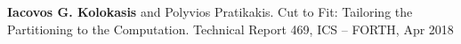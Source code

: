 
\vspace{-15pt}
\begin{cventries}

  \cventry
    {}
    {}
    {}
    {}
    {\textbf{Iacovos G. Kolokasis} and Polyvios Pratikakis.
      Cut to Fit: Tailoring the Partitioning to the Computation.
      Technical Report 469, ICS -- FORTH, Apr 2018 }{}%


\end{cventries}
